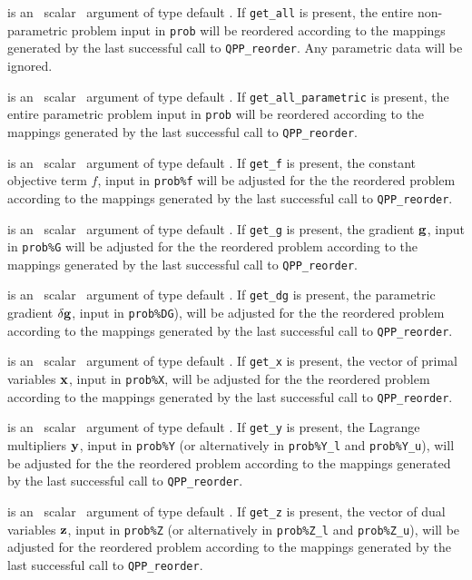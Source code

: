 \documentclass{galahad}
\newcommand{\packagename}{QPP}
\begin{document}
\begin{description}
is an \optional\ scalar \intentin\ argument of type default \logical.
If {\tt get\_all} is present, the entire non-parametric problem
input in {\tt prob} will be reordered according to the
mappings generated by the last successful call to {\tt \packagename\_reorder}.
Any parametric data will be ignored.

is an \optional\ scalar \intentin\ argument of type default \logical.
If {\tt get\_all\_parametric} is present, the entire parametric problem
input in {\tt prob} will be reordered according to the
mappings generated by the last successful call to {\tt \packagename\_reorder}.

is an \optional\ scalar \intentin\ argument of type default \logical.
If {\tt get\_f} is present, the constant objective term
$f$, input in {\tt prob\%f}
will be adjusted for the the reordered problem according to the
mappings generated by the last successful call to {\tt \packagename\_reorder}.

is an \optional\ scalar \intentin\ argument of type default \logical.
If {\tt get\_g} is present, the gradient
${\mathbf{g}}$, input in {\tt prob\%G}
will be adjusted for the the reordered problem according to the
mappings generated by the last successful call to {\tt \packagename\_reorder}.

is an \optional\ scalar \intentin\ argument of type default \logical.
If {\tt get\_dg} is present, the parametric gradient $\delta {\mathbf{g}}$, input in
{\tt prob\%DG}),
will be adjusted for the the reordered problem according to the
mappings generated by the last successful call to {\tt \packagename\_reorder}.

is an \optional\ scalar \intentin\ argument of type default \logical.
If {\tt get\_x} is present, the vector of primal variables ${\mathbf{x}}$,
input in {\tt prob\%X}, will be
adjusted for the the reordered problem according to the
mappings generated by the last successful call to {\tt \packagename\_reorder}.

is an \optional\ scalar \intentin\ argument of type default \logical.
If {\tt get\_y} is present, the
Lagrange multipliers ${\mathbf{y}}$, input in {\tt prob\%Y}
(or alternatively in {\tt prob\%Y\_l} and {\tt prob\%Y\_u}),
will be adjusted for the the reordered problem according to the
mappings generated by the last successful call to {\tt \packagename\_reorder}.

is an \optional\ scalar \intentin\ argument of type default \logical.
If {\tt get\_z} is present, the vector of dual variables ${\mathbf{z}}$, input in
{\tt prob\%Z} (or alternatively in {\tt prob\%Z\_l} and {\tt prob\%Z\_u}),
will be adjusted for the reordered problem according
to the mappings generated by the last successful
call to {\tt \packagename\_reorder}.


\end{description}
\end{document}
